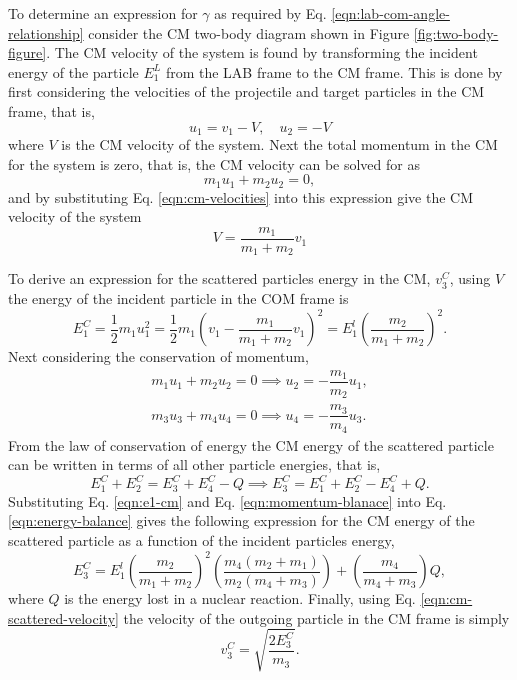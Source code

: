To determine an expression for $\gamma$ as required by Eq. \eqref{eqn:lab-com-angle-relationship} consider the CM two-body diagram shown in Figure \ref{fig:two-body-figure}. The CM velocity of the system is found by transforming the incident energy of the particle $E_1^L$ from the LAB frame to the CM frame. This is done by first considering the velocities of the projectile and target particles in the CM frame, that is,
\begin{equation} \label{eqn:cm-velocities}
    u_1 = v_1 - V, \quad u_2 = -V
\end{equation}
where $V$ is the CM velocity of the system. Next the total momentum in the CM for the system is zero, that is, the CM velocity can be solved for as
\begin{equation}
  m_1 u_1 + m_2 u_2 = 0,
\end{equation}
and by substituting Eq. \eqref{eqn:cm-velocities} into this expression give the CM velocity of the system
\begin{equation}
  V = \dfrac{m_1}{m_1 + m_2} v_1
\end{equation}

To derive an expression for the scattered particles energy in the CM, $v_3^C$, using $V$ the energy of the incident particle in the COM frame is
\begin{equation} \label{eqn:e1-cm}
  E_1^C = \dfrac{1}{2} m_1 u_1^2 = \dfrac{1}{2} m_1 \left( v_1 - \dfrac{m_1}{m_1 + m_2} v_1 \right)^2 = E_1^l \left( \dfrac{m_2}{m_1+m_2} \right)^2.
\end{equation}
Next considering the conservation of momentum,
\begin{gather} \label{eqn:momentum-blanace}
  m_1 u_1 + m_2 u_2 = 0 \implies u_2 = -\dfrac{m_1}{m_2} u_1, \\
  m_{3} u_{3} + m_{4} u_{4} = 0 \implies u_{4} = -\dfrac{m_{3}}{m_{4}} u_{3}.
\end{gather} 
From the law of conservation of energy the CM energy of the scattered particle can be written in terms of all other particle energies, that is,
\begin{equation} \label{eqn:energy-balance}
  E_1^C + E_2^C = E_3^C + E_4^C - Q \implies E_3^C = E_1^C + E_2^C - E_4^C + Q.
\end{equation}
Substituting Eq. \eqref{eqn:e1-cm} and Eq. \eqref{eqn:momentum-blanace} into Eq. \eqref{eqn:energy-balance} gives the following expression for the CM energy of the scattered particle as a function of the incident particles energy,
\begin{equation} \label{eqn:cm-scattered-velocity}
  E_{3}^C = E_1^l \left( \dfrac{m_2}{m_1+m_2} \right)^2 \left(\dfrac{m_{4}(m_2 + m_1)}{m_2(m_{4}+m_{3})}\right) + \left(\dfrac{m_{4}}{m_{4}+m_{3}}\right) Q,
\end{equation}
where $Q$ is the energy lost in a nuclear reaction. Finally, using Eq. \eqref{eqn:cm-scattered-velocity} the velocity of the outgoing particle in the CM frame is simply
\begin{equation}
  v_{3}^C = \sqrt{\frac{2 E_{3}^C}{m_{3}}}.
\end{equation}

